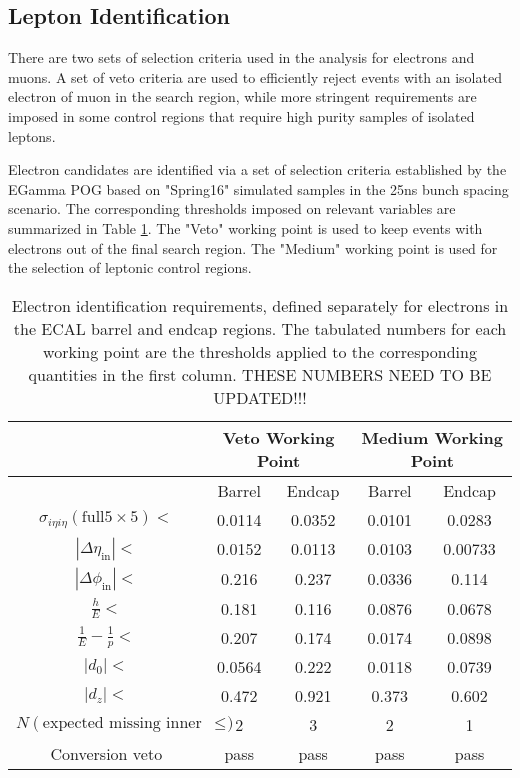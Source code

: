  \subsection{Lepton Identification}\label{EleMuonID}
 There are two sets of selection criteria used in the analysis for electrons and muons. A set of veto criteria are used to efficiently reject events with an isolated electron of muon in the search region, while more stringent requirements are imposed in some control regions that require high purity samples of isolated leptons.
 
 Electron candidates are identified via a set of selection criteria established by the EGamma POG based on "Spring16" simulated samples in the 25ns bunch spacing scenario. The corresponding thresholds imposed on relevant variables are summarized in Table \ref{ElectronID}. The "Veto" working point is used to keep events with electrons out of the final search region. The "Medium" working point is used for the selection of leptonic control regions. 
 
 \begin{table}
 \centering
 \begin{tabular}{|*{5}{c|}}
 \hline
 \multirow{2}{*}{} & \multicolumn{2}{c}{Veto Working Point} & \multicolumn{2}{|c|}{Medium Working Point} \\
 \hline
 & Barrel & Endcap & Barrel & Endcap \\
\hline
$\sigma_{i\eta i \eta} (\text{full} 5 \times 5) <$ & 0.0114 & 0.0352 & 0.0101 & 0.0283 \\
$|\Delta\eta_{\text{in}}|<$ & 0.0152 & 0.0113 & 0.0103 & 0.00733 \\
$|\Delta\phi_{\text{in}}|<$ & 0.216 & 0.237 & 0.0336 & 0.114 \\
$\frac{h}{E} <$ & 0.181 & 0.116 & 0.0876 & 0.0678 \\
$\frac{1}{E}-\frac{1}{p}<$ & 0.207 & 0.174 & 0.0174 & 0.0898 \\
$|d_0|<$ & 0.0564 & 0.222 & 0.0118 & 0.0739 \\
$|d_z|<$ & 0.472 & 0.921 & 0.373 & 0.602 \\
$N(\text{expected missing inner hits})\leq$ & 2 & 3 & 2 & 1 \\
Conversion veto & pass & pass & pass & pass \\
\hline
 \end{tabular}
 \caption[Electron Identification Parameters]{Electron identification requirements, defined separately for electrons in the ECAL barrel and endcap regions. The tabulated numbers for each working point are the thresholds applied to the corresponding quantities in the first column. THESE NUMBERS NEED TO BE UPDATED!!!}
 \label{ElectronID}
 \end{table}
 
